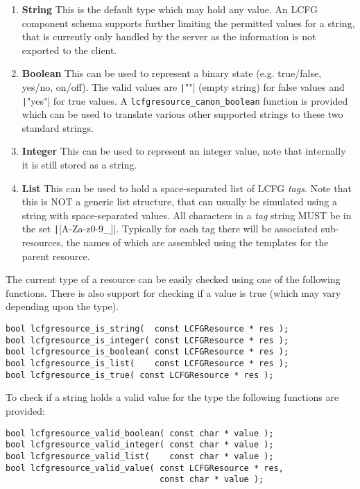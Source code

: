\documentclass[11pt,a4paper,titlepage]{article}
\begin{document}
\begin{enumerate}

\item \textbf{String} This is the default type which may hold any
  value. An LCFG component schema supports further limiting the
  permitted values for a string, that is currently only handled by
  the server as the information is not exported to the client.

\item \textbf{Boolean} This can be used to represent a binary state
  (e.g. true/false, yes/no, on/off). The valid values are \texttt|""|
  (empty string) for false values and \texttt|"yes"| for true values. A
  \texttt{lcfgresource\_canon\_boolean} function is provided which can
  be used to translate various other supported strings to these two
  standard strings.

\item \textbf{Integer} This can be used to represent an integer value,
  note that internally it is still stored as a string.

\item \textbf{List} This can be used to hold a space-separated list of
  LCFG \textit{tags}. Note that this is NOT a generic list structure,
  that can usually be simulated using a string with space-separated
  values. All characters in a \textit{tag} string MUST be in the set
  \texttt|[A-Za-z0-9_]|. Typically for each tag there will be associated
  sub-resources, the names of which are assembled using the templates
  for the parent resource.

\end{enumerate}

The current type of a resource can be easily checked using one of the
following functions. There is also support for checking if a value is
true (which may vary depending upon the type).

\begin{verbatim}
bool lcfgresource_is_string(  const LCFGResource * res );
bool lcfgresource_is_integer( const LCFGResource * res );
bool lcfgresource_is_boolean( const LCFGResource * res );
bool lcfgresource_is_list(    const LCFGResource * res );
bool lcfgresource_is_true( const LCFGResource * res );
\end{verbatim}

To check if a string holds a valid value for the type the following
functions are provided:

\begin{verbatim}
bool lcfgresource_valid_boolean( const char * value );
bool lcfgresource_valid_integer( const char * value );
bool lcfgresource_valid_list(    const char * value );
bool lcfgresource_valid_value( const LCFGResource * res,
                               const char * value );
\end{verbatim}
\end{document}
